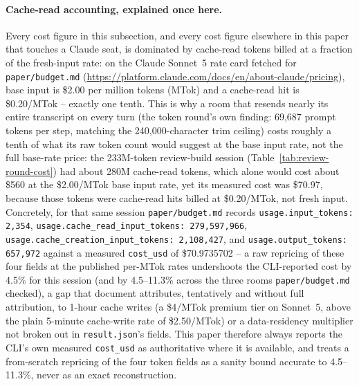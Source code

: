 \paragraph{Cache-read accounting, explained once here.} Every cost figure in this
subsection, and every cost figure elsewhere in this paper that touches a Claude seat,
is dominated by cache-read tokens billed at a fraction of the fresh-input rate: on the
Claude Sonnet~5 rate card fetched for \texttt{paper/budget.md}
(\url{https://platform.claude.com/docs/en/about-claude/pricing}), base input is
\$2.00 per million tokens (MTok) and a cache-read hit is \$0.20/MTok -- exactly one
tenth. This is why a room that resends nearly its entire transcript on every turn (the
token round's own finding: 69,687 prompt tokens per step, matching the 240,000-character
trim ceiling) costs roughly a tenth of what its raw token count would suggest at the
base input rate, not the full base-rate price: the 233M-token review-build session
(Table~\ref{tab:review-round-cost}) had about 280M cache-read tokens, which alone would
cost about \$560 at the \$2.00/MTok base input rate, yet its measured cost was \$70.97,
because those tokens were cache-read hits billed at \$0.20/MTok, not fresh input.
Concretely, for that same session \texttt{paper/budget.md} records
\texttt{usage.input\_tokens: 2{,}354}, \texttt{usage.cache\_read\_input\_tokens:
279{,}597{,}966}, \texttt{usage.cache\_creation\_input\_tokens: 2{,}108{,}427}, and
\texttt{usage.output\_tokens: 657{,}972} against a measured \texttt{cost\_usd} of
\$70.9735702 -- a raw repricing of these four fields at the published per-MTok rates
undershoots the CLI-reported cost by 4.5\% for this session (and by 4.5--11.3\% across
the three rooms \texttt{paper/budget.md} checked), a gap that document attributes,
tentatively and without full attribution, to 1-hour cache writes (a \$4/MTok premium
tier on Sonnet~5, above the plain 5-minute cache-write rate of \$2.50/MTok) or a
data-residency multiplier not broken out in \texttt{result.json}'s fields. This paper
therefore always reports the CLI's own measured \texttt{cost\_usd} as authoritative
where it is available, and treats a from-scratch repricing of the four token fields as a
sanity bound accurate to 4.5--11.3\%, never as an exact reconstruction.

